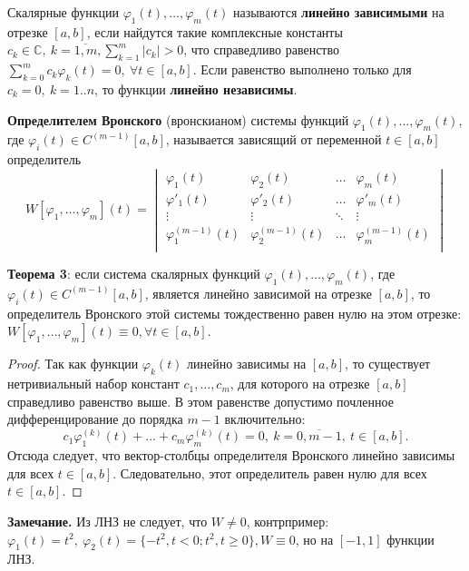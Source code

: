 Скалярные функции $\varphi_1(t),\dots ,\varphi_m(t)$ называются \textbf{линейно зависимыми} на отрезке $[a,b]$, если найдутся такие комплексные константы 
$c_k \in \mathbb{C},~k = \overline{1,m}, \sum_{k=1}^m |c_k| > 0$, 
что справедливо равенство
$\displaystyle \sum_{k=0}^m c_k\varphi_k(t) = 0,~\forall t \in [a, b].$
Если равенство выполнено только для $c_k = 0, \ k=1..n$, то функции \textbf{линейно независимы}.

\textbf{Определителем Вронского} (вронскианом) системы функций $\varphi_1(t),\dots, \varphi_m(t)$, 
где $\varphi_i(t) \in C^{(m-1)}[a, b]$, называется зависящий от переменной $t \in [a, b]$ определитель
$$W[\varphi_1,\dots,\varphi_m](t) = \begin{vmatrix} \varphi_1(t) & \varphi_2(t) & \dots & \varphi_m(t) \\ \varphi'_1(t) & \varphi'_2(t) & \dots & \varphi'_m(t) \\ \vdots & \vdots & \ddots & \vdots \\ \varphi^{(m-1)}_1(t) & \varphi^{(m-1)}_2(t) & \dots & \varphi^{(m-1)}_m(t) \\ \end{vmatrix}$$


\textbf{Теорема 3}: если система скалярных функций $\varphi_1(t),\dots, \varphi_m(t)$, 
где $\varphi_i(t) \in C^{(m-1)}[a, b]$,
является линейно зависимой на отрезке $[a, b]$, то определитель Вронского этой системы тождественно равен нулю на этом отрезке: $W[\varphi_1,\dots ,\varphi_m](t) \equiv 0, \forall t \in [a,b]$.

\begin{proof}
Так как функции $\varphi_k(t)$ линейно зависимы на $[a,b]$, то существует нетривиальный набор констант $c_1,\dots, c_m$, для которого на отрезке $[a,b]$ справедливо равенство выше. В этом равенстве допустимо почленное дифференцирование до порядка $m - 1$ включительно:
$$c_1\varphi^{(k)}_1(t)+\dots +c_m\varphi^{(k)}_m(t)=0,~k=\overline{0,m-1},~t\in[a,b].$$
Отсюда следует, что вектор-столбцы определителя Вронского линейно зависимы для всех $t \in [a,b]$. Следовательно, этот определитель равен нулю для всех $t \in [a, b]$.
\end{proof}


\textbf{Замечание.} Из ЛНЗ не следует, что $W\neq 0$, контрпример: $\varphi_1(t) = t^2,~\varphi_2(t) = \{-t^2, t < 0; t^2, t \geq 0\}, W \equiv 0$, но на $[-1, 1]$ функции ЛНЗ.

